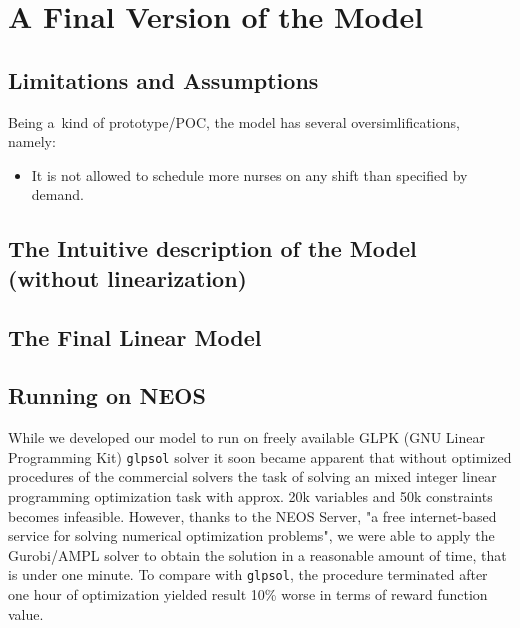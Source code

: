 \section{A Final Version of the Model}

\subsection{Limitations and Assumptions}

Being a~kind of prototype/POC, the model has several oversimlifications, namely:

\begin{itemize}
    \item It is not allowed to schedule more nurses on any shift than specified by demand.
\end{itemize}

\subsection{The Intuitive description of the Model (without linearization)}

\subsection{The Final Linear Model}

\subsection{Running on NEOS}

While we developed our model to run on freely available GLPK (GNU Linear Programming Kit) \texttt{glpsol} solver it soon became apparent that without optimized procedures of the commercial solvers the task of solving an mixed integer linear programming optimization task with approx. 20k variables and 50k constraints becomes infeasible. However, thanks to the NEOS Server, "a free internet-based service for solving numerical optimization problems", we were able to apply the Gurobi/AMPL solver to obtain the solution in a reasonable amount of time, that is under one minute. To compare with \texttt{glpsol}, the procedure terminated after one hour of optimization yielded result 10\% worse in terms of reward function value.
